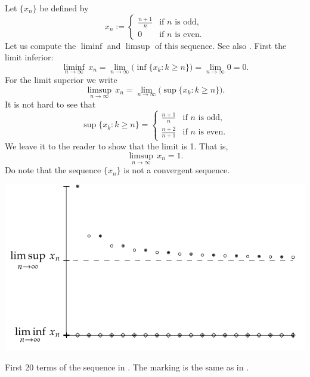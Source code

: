 \begin{example} \label{example:liminfsupex}
Let $\{ x_n \}$ be defined by
\begin{equation*}
x_n :=
\begin{cases}
\frac{n+1}{n} & \text{if } n \text{ is odd,} \\
0             & \text{if } n \text{ is even.}
\end{cases}
\end{equation*}
Let us compute the $\liminf$ and $\limsup$ of this sequence.  See also
.  First the
limit inferior:
\begin{equation*}
\liminf_{n\to\infty} \, x_n = 
\lim_{n\to\infty}
\bigl(
\inf \{ x_k : k \geq n \}
\bigr)
=
\lim_{n\to\infty} 0 = 0 .
\end{equation*}
For the limit superior we write
\begin{equation*}
\limsup_{n\to\infty} \, x_n = 
\lim_{n\to\infty}
\bigl(
\sup \{ x_k : k \geq n \}
\bigr) .
\end{equation*}
It is not hard to see that
\begin{equation*}
\sup \{ x_k : k \geq n \} =
\begin{cases}
\frac{n+1}{n}   & \text{if } n \text{ is odd,} \\
\frac{n+2}{n+1} & \text{if } n \text{ is even.}
\end{cases}
\end{equation*}
We leave it to the reader to show that the limit is 1.  That is,
\begin{equation*}
\limsup_{n\to\infty} \, x_n = 1 .
\end{equation*}
Do note that the sequence $\{ x_n \}$ is not a convergent sequence.
\begin{myfigureht}
\includegraphics{figures/sequence-limsupliminf_an_bn-example}
\caption{First 20 terms of the sequence in .
The marking is the same as in .
\label{sequence-limsupliminf_an_bn-example}}
\end{myfigureht}
\end{example}

